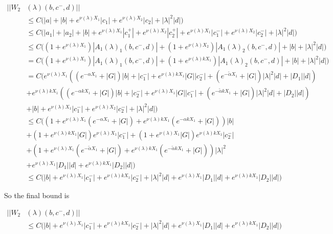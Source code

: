 \documentclass[12pt]{article}
\begin{document}
\begin{enumerate}
\begin{align*}
||W_2&(\lambda)(b,c^-,d)|| \\
&\leq C \Big(|a| + |b| + e^{\nu(\lambda)X_1}|c_1| + e^{\nu(\lambda)X_2}|c_2| + |\lambda|^2 |d| \Big) \\
&\leq C \Big(|a_1| + |a_2| + |b| + e^{\nu(\lambda)X_1}|c_1^+| + e^{\nu(\lambda)X_2}|c_2^+| + e^{\nu(\lambda)X_1}|c_1^-| + e^{\nu(\lambda)X_2}|c_2^-| + |\lambda|^2 |d| \Big) \\
&\leq C \Big( (1 + e^{\nu(\lambda)X_1}) |A_1(\lambda)_1(b, c^-, d)| + (1 + e^{\nu(\lambda)X_2})|A_1(\lambda)_2(b, c^-, d)| + |b| + |\lambda|^2 |d| \Big)\\
&= C \Big( (1 + e^{\nu(\lambda)X_1}) |A_1(\lambda)_1(b, c^-, d)| + (1 + e^{\nu(\lambda)k X_1 })|A_1(\lambda)_2(b, c^-, d)| + |b| + |\lambda|^2 |d| \Big)\\
&= C \Big( e^{\nu(\lambda)X_1} ((e^{-\alpha X_1} + |G|) |b| + |c_1^-| + e^{\nu(\lambda)k X_1} |G||c_2^-| + (e^{-\tilde{\alpha} X_1} + |G|) |\lambda|^2 |d| + |D_1||d| )\\
&+ e^{\nu(\lambda)k X_1} ((e^{-\alpha k X_1} + |G|) |b| + |c_2^-| + e^{\nu(\lambda) X_1} |G||c_1^-| + (e^{-\tilde{\alpha} k X_1} + |G|) |\lambda|^2 |d| + |D_2||d| )\\
&+ |b| + e^{\nu(\lambda)X_1}|c_1^-| + e^{\nu(\lambda)X_2}|c_2^-| + |\lambda|^2 |d| \Big) \\
&\leq C\Big( (1 + e^{\nu(\lambda)X_1} (e^{-\alpha X_1} + |G|) + e^{\nu(\lambda)k X_1} (e^{-\alpha k X_1} + |G|)) |b|\\
&+ ( 1 + e^{\nu(\lambda)k X_1} |G|) e^{\nu(\lambda)X_1}|c_1^-|
+ ( 1 + e^{\nu(\lambda) X_1} |G|) e^{\nu(\lambda)k X_1}|c_2^-|\\
&+( 1 + e^{\nu(\lambda)X_1}(e^{-\tilde{\alpha} X_1} + |G|)  + e^{\nu(\lambda)k X_1} (e^{-\tilde{\alpha} k X_1} + |G|)) |\lambda|^2 \\
&+ e^{\nu(\lambda)X_1}|D_1||d| + e^{\nu(\lambda)k X_1}|D_2||d| \Big)\\
&\leq C\Big( |b| + e^{\nu(\lambda) X_1} |c_1^-| +  e^{\nu(\lambda) k X_1} |c_2^-| + |\lambda|^2 |d| + e^{\nu(\lambda) X_1} |D_1| |d| + e^{\nu(\lambda) k X_1} |D_2| |d| \Big)
\end{align*}

So the final bound is

\begin{align*}
||W_2&(\lambda)(b,c^-,d)|| \\
&\leq C\Big( |b| + e^{\nu(\lambda) X_1} |c_1^-| +  e^{\nu(\lambda) k X_1} |c_2^-| + |\lambda|^2 |d| + e^{\nu(\lambda) X_1} |D_1| |d| + e^{\nu(\lambda) k X_1} |D_2| |d| \Big)
\end{align*}


\end{enumerate}
\end{document}
